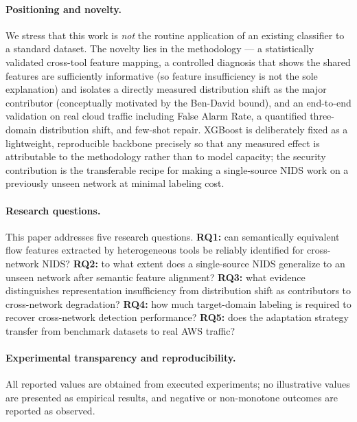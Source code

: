 \documentclass[preprint,12pt,authoryear]{elsarticle}
\begin{document}
\paragraph{Positioning and novelty.} We stress that this work is \emph{not} the
routine application of an existing classifier to a standard dataset. The novelty
lies in the methodology --- a statistically validated cross-tool feature mapping,
a controlled diagnosis that shows the shared features are sufficiently informative
(so feature insufficiency is not the sole explanation) and isolates a directly
measured distribution shift as the major contributor (conceptually
motivated by the Ben-David bound), and an end-to-end validation on real cloud
traffic including False Alarm Rate, a quantified three-domain distribution shift,
and few-shot repair. XGBoost is deliberately fixed as a lightweight, reproducible
backbone precisely so that any measured effect is attributable to the methodology
rather than to model capacity; the security contribution is the transferable
recipe for making a single-source NIDS work on a previously unseen network at
minimal labeling cost.

\paragraph{Research questions.} This paper addresses five research questions.
\textbf{RQ1:} can semantically equivalent flow features extracted by heterogeneous
tools be reliably identified for cross-network NIDS? \textbf{RQ2:} to what extent
does a single-source NIDS generalize to an unseen network after semantic feature
alignment? \textbf{RQ3:} what evidence distinguishes representation insufficiency
from distribution shift as contributors to cross-network degradation? \textbf{RQ4:}
how much target-domain labeling is required to recover cross-network detection
performance? \textbf{RQ5:} does the adaptation strategy transfer from benchmark
datasets to real AWS traffic?

\paragraph{Experimental transparency and reproducibility.} All reported values are
obtained from executed experiments; no illustrative values are presented as
empirical results, and negative or non-monotone outcomes are reported as observed.

\FloatBarrier

\end{document}
